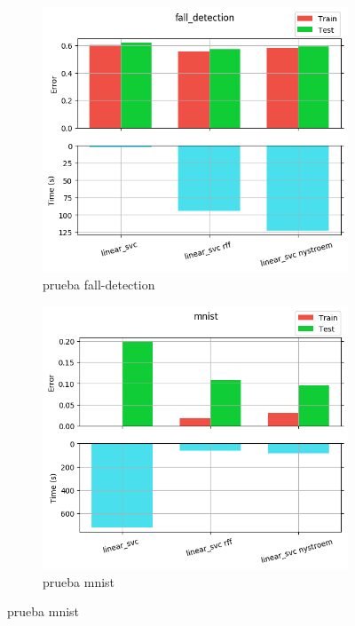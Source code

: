 \begin{figure}[ht]
  \centering
  \begin{subfigure}[b]{0.5\linewidth}
    \centering\includegraphics[width=\imgscale\linewidth]{Figures/2_5/fall_detection}
    \caption{prueba fall-detection}
    \label{fig:2_5_fall_detection}
  \end{subfigure}%
  \begin{subfigure}[b]{0.5\linewidth}
    \centering\includegraphics[width=\imgscale\linewidth]{Figures/2_5/mnist}
    \caption{prueba mnist}
    \label{fig:2_5_mnist}
  \end{subfigure}
\end{figure}


